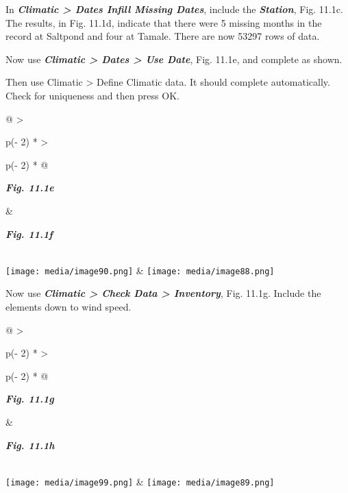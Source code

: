 \documentclass[
  letterpaper,
  DIV=11,
  numbers=noendperiod]{scrreprt}
\begin{document}
In \textbf{\emph{Climatic \textgreater{} Dates Infill Missing Dates}},
include the \textbf{\emph{Station}}, Fig. 11.1c. The results, in Fig.
11.1d, indicate that there were 5 missing months in the record at
Saltpond and four at Tamale. There are now 53297 rows of data.

Now use \textbf{\emph{Climatic \textgreater{} Dates \textgreater{} Use
Date}}, Fig. 11.1e, and complete as shown.

Then use Climatic \textgreater{} Define Climatic data. It should
complete automatically. Check for uniqueness and then press OK.

\begin{longtable}[]{@{}
  >{\raggedright\arraybackslash}p{(\columnwidth - 2\tabcolsep) * }
  >{\raggedright\arraybackslash}p{(\columnwidth - 2\tabcolsep) * }@{}}
\toprule\noalign{}
\begin{minipage}[b]{\linewidth}\raggedright
\textbf{\emph{Fig. 11.1e}}
\end{minipage} & \begin{minipage}[b]{\linewidth}\raggedright
\textbf{\emph{Fig. 11.1f}}
\end{minipage} \\
\midrule\noalign{}
\endhead
\bottomrule\noalign{}
\endlastfoot
\texttt{[image: media/image90.png]} &
\texttt{[image: media/image88.png]} \\
\end{longtable}

Now use \textbf{\emph{Climatic \textgreater{} Check Data \textgreater{}
Inventory}}, Fig. 11.1g. Include the elements down to wind speed.

\begin{longtable}[]{@{}
  >{\raggedright\arraybackslash}p{(\columnwidth - 2\tabcolsep) * }
  >{\raggedright\arraybackslash}p{(\columnwidth - 2\tabcolsep) * }@{}}
\toprule\noalign{}
\begin{minipage}[b]{\linewidth}\raggedright
\textbf{\emph{Fig. 11.1g}}
\end{minipage} & \begin{minipage}[b]{\linewidth}\raggedright
\textbf{\emph{Fig. 11.1h}}
\end{minipage} \\
\midrule\noalign{}
\endhead
\bottomrule\noalign{}
\endlastfoot
\texttt{[image: media/image99.png]} &
\texttt{[image: media/image89.png]} \\
\end{longtable}
\end{document}
